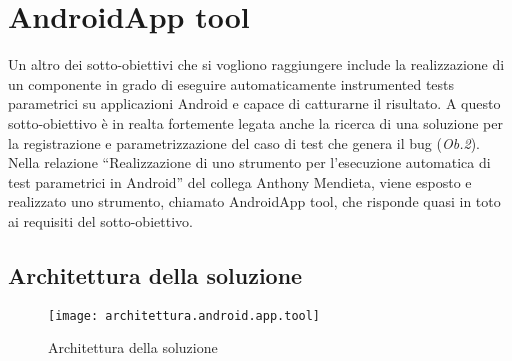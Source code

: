 \section{AndroidApp tool}
\label{androidapptool}
Un altro dei sotto-obiettivi che si vogliono raggiungere include la realizzazione di un componente in grado di eseguire automaticamente instrumented tests parametrici su applicazioni Android e capace di catturarne il risultato. A questo sotto-obiettivo è in realta fortemente legata anche la ricerca di una soluzione per la registrazione e parametrizzazione del caso di test che genera il bug (\emph{Ob.2}).  Nella relazione “Realizzazione di uno strumento per l’esecuzione automatica di test parametrici in Android” del collega Anthony Mendieta, viene esposto e realizzato uno strumento, chiamato AndroidApp tool, che risponde quasi in toto ai requisiti del sotto-obiettivo. 
\subsection{Architettura della soluzione}
 \begin{figure}[H]
	\texttt{[image: architettura.android.app.tool]}
	\centering
	\caption[]{Architettura della soluzione \footnotemark }%
    \label{fig:arch.mendieta}
\end{figure}

